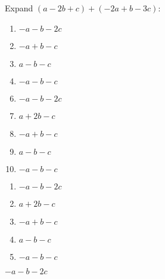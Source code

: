 

 Expand $(a-2b+c)+(-2a+b-3c)$:


\ifsat
	\begin{enumerate}[label=\Alph*)]
		\item   $-a-b-2c$%
		\item  $-a+b-c$
		\item  $a-b-c$
		\item   $-a-b-c$
	\end{enumerate}
\else
\fi

\ifacteven
	\begin{enumerate}[label=\textbf{\Alph*.},itemsep=\fill,align=left]
		\setcounter{enumii}{5}
		\item   $-a-b-2c$%
		\item  $a+2b-c$
		\item  $-a+b-c$
		\addtocounter{enumii}{1}
		\item  $a-b-c$
		\item   $-a-b-c$
	\end{enumerate}
\else
\fi

\ifactodd
	\begin{enumerate}[label=\textbf{\Alph*.},itemsep=\fill,align=left]
		\item   $-a-b-2c$%
		\item  $a+2b-c$
		\item  $-a+b-c$
		\item  $a-b-c$
		\item   $-a-b-c$
	\end{enumerate}
\else
\fi

\ifgridin
   $-a-b-2c$%
		
\else
\fi

